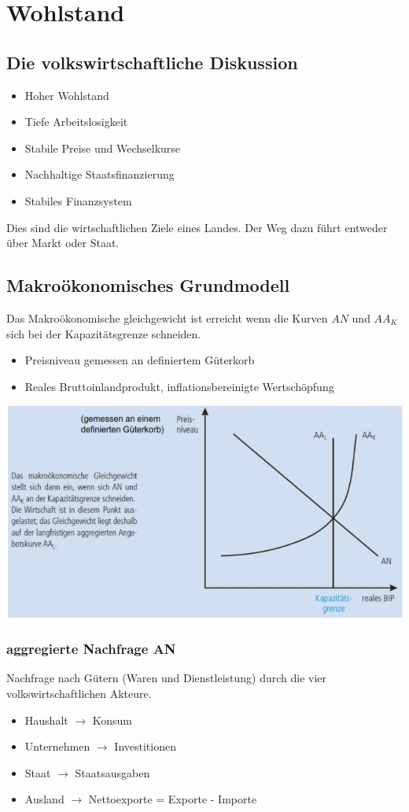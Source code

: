 \section{Wohlstand}
\subsection{Die volkswirtschaftliche Diskussion}
\begin{itemize}
	\item Hoher Wohlstand
	\item Tiefe Arbeitslosigkeit
	\item Stabile Preise und Wechselkurse
	\item Nachhaltige Staatsfinanzierung
	\item Stabiles Finanzsystem
\end{itemize}
Dies sind die wirtschaftlichen Ziele eines Landes. Der Weg dazu führt entweder über Markt oder Staat.
\subsection{Makroökonomisches Grundmodell}
Das Makroökonomische gleichgewicht ist erreicht wenn die Kurven $AN$ und $AA_K$ sich bei der Kapazitätsgrenze schneiden. 
\begin{itemize}
	\item Preisniveau gemessen an definiertem Güterkorb
	\item Reales Bruttoinlandprodukt, inflationsbereinigte Wertschöpfung
\end{itemize}
	\includegraphics[width=0.85\linewidth]{images/makro.jpg}
	\subsubsection{aggregierte Nachfrage AN}
	Nachfrage nach Gütern (Waren und Dienstleistung) durch die vier volkswirtschaftlichen Akteure.
	\begin{itemize}
		\item Haushalt $\rightarrow$ Konsum
		\item Unternehmen $\rightarrow$ Investitionen
		\item Staat $\rightarrow$ Staatsausgaben
		\item Ausland $\rightarrow$ Nettoexporte = Exporte - Importe
	\end{itemize}
